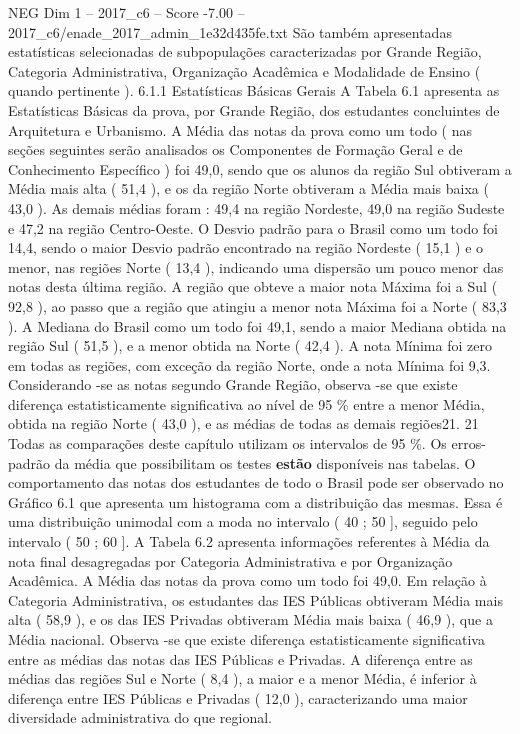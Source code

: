 \begin{textsample}{NEG Dim 1 – 2017\_c6 – Score -7.00 – 2017\_c6/enade\_2017\_admin\_1e32d435fe.txt}
São também apresentadas estatísticas selecionadas de subpopulações caracterizadas por Grande Região, Categoria Administrativa, Organização Acadêmica e Modalidade de Ensino ( quando pertinente ). 6.1.1 Estatísticas Básicas Gerais A Tabela 6.1 apresenta as Estatísticas Básicas da prova, por Grande Região, dos estudantes concluintes de Arquitetura e Urbanismo.
A Média das notas da prova como um todo ( nas seções seguintes serão analisados os Componentes de Formação Geral e de Conhecimento Específico ) foi 49,0, sendo que os alunos da região Sul obtiveram a Média mais alta ( 51,4 ), e os da região Norte obtiveram a Média mais baixa ( 43,0 ).
As demais médias foram : 49,4 na região Nordeste, 49,0 na região Sudeste e 47,2 na região Centro-Oeste.
O Desvio padrão para o Brasil como um todo foi 14,4, sendo o maior Desvio padrão encontrado na região Nordeste ( 15,1 ) e o menor, nas regiões Norte ( 13,4 ), indicando uma dispersão um pouco menor das notas desta última região.
A região que obteve a maior nota Máxima foi a Sul ( 92,8 ), ao passo que a região que atingiu a menor nota Máxima foi a Norte ( 83,3 ).
A Mediana do Brasil como um todo foi 49,1, sendo a maior Mediana obtida na região Sul ( 51,5 ), e a menor obtida na Norte ( 42,4 ).
A nota Mínima foi zero em todas as regiões, com exceção da região Norte, onde a nota Mínima foi 9,3.
Considerando -se as notas segundo Grande Região, observa -se que existe diferença estatisticamente significativa ao nível de 95 \% entre a menor Média, obtida na região Norte ( 43,0 ), e as médias de todas as demais regiões21. 21 Todas as comparações deste capítulo utilizam os intervalos de 95 \%.
Os erros-padrão da média que possibilitam os testes \textbf{estão} disponíveis nas tabelas.
O comportamento das notas dos estudantes de todo o Brasil pode ser observado no Gráfico 6.1 que apresenta um histograma com a distribuição das mesmas.
Essa é uma distribuição unimodal com a moda no intervalo ( 40 ; 50 ], seguido pelo intervalo ( 50 ; 60 ].
A Tabela 6.2 apresenta informações referentes à Média da nota final desagregadas por Categoria Administrativa e por Organização Acadêmica.
A Média das notas da prova como um todo foi 49,0.
Em relação à Categoria Administrativa, os estudantes das IES Públicas obtiveram Média mais alta ( 58,9 ), e os das IES Privadas obtiveram Média mais baixa ( 46,9 ), que a Média nacional.
Observa -se que existe diferença estatisticamente significativa entre as médias das notas das IES Públicas e Privadas.
A diferença entre as médias das regiões Sul e Norte ( 8,4 ), a maior e a menor Média, é inferior à diferença entre IES Públicas e Privadas ( 12,0 ), caracterizando uma maior diversidade administrativa do que regional.

\end{textsample}
